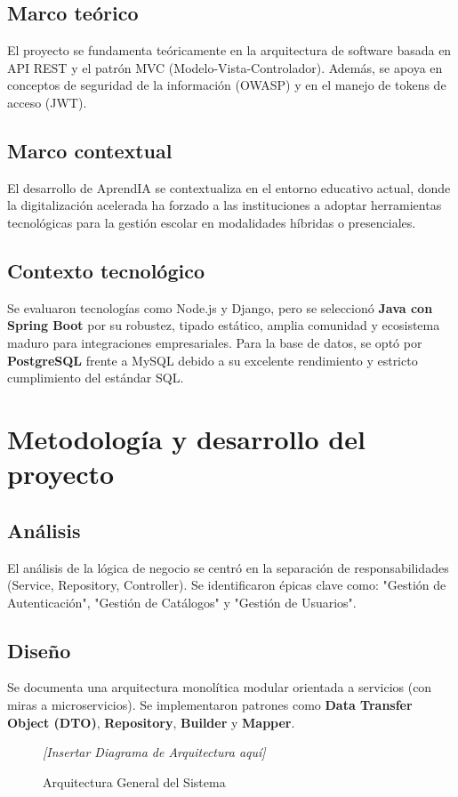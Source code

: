 \documentclass[12pt, a4paper]{article}
\begin{document}
\subsection{Marco teórico}
El proyecto se fundamenta teóricamente en la arquitectura de software basada en API REST y el patrón MVC (Modelo-Vista-Controlador). Además, se apoya en conceptos de seguridad de la información (OWASP) y en el manejo de tokens de acceso (JWT).

\subsection{Marco contextual}
El desarrollo de AprendIA se contextualiza en el entorno educativo actual, donde la digitalización acelerada ha forzado a las instituciones a adoptar herramientas tecnológicas para la gestión escolar en modalidades híbridas o presenciales.

\subsection{Contexto tecnológico}
Se evaluaron tecnologías como Node.js y Django, pero se seleccionó \textbf{Java con Spring Boot} por su robustez, tipado estático, amplia comunidad y ecosistema maduro para integraciones empresariales. Para la base de datos, se optó por \textbf{PostgreSQL} frente a MySQL debido a su excelente rendimiento y estricto cumplimiento del estándar SQL.

\section{Metodología y desarrollo del proyecto}

\subsection{Análisis}
El análisis de la lógica de negocio se centró en la separación de responsabilidades (Service, Repository, Controller). Se identificaron épicas clave como: "Gestión de Autenticación", "Gestión de Catálogos" y "Gestión de Usuarios".

\subsection{Diseño}
Se documenta una arquitectura monolítica modular orientada a servicios (con miras a microservicios). Se implementaron patrones como \textbf{Data Transfer Object (DTO)}, \textbf{Repository}, \textbf{Builder} y \textbf{Mapper}.
\vspace{0.5cm}
\begin{figure}[H]
    \centering
    \textit{[Insertar Diagrama de Arquitectura aquí]}
    \caption{Arquitectura General del Sistema}
\end{figure}
\end{document}
